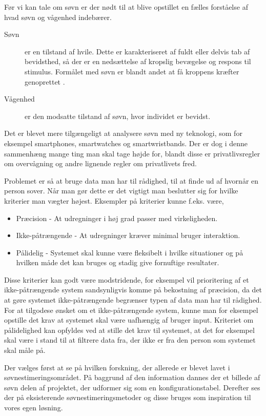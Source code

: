Før vi kan tale om søvn er der nødt til at blive opstillet en fælles forståelse af hvad søvn og vågenhed indebærer.
\begin{description}
		\item[Søvn] er en tilstand af hvile. Dette er karakteriseret af fuldt eller delvis tab af bevidsthed, så der er en nedsættelse af kropslig bevægelse og respons til stimulus. Formålet med søvn er blandt andet at få kroppens kræfter genoprettet \citep{misc:SleepDefinition}.
		\item[Vågenhed] er den modsatte tilstand af søvn, hvor individet er bevidst.
\end{description}

Det er blevet mere tilgængeligt at analysere søvn med ny teknologi, som for eksempel smartphones, smartwatches og smartwristbands.
Der er dog i denne sammenhæng mange ting man skal tage højde for, blandt disse er privatlivsregler om overvågning og andre lignende regler om privatlivets fred.

Problemet er så at bruge data man har til rådighed, til at finde ud af hvornår en person sover.
Når man gør dette er det vigtigt man beslutter sig for hvilke kriterier man vægter højest.
Eksempler på kriterier kunne f.eks. være,

\begin{itemize}
	\item Præcision - At udregninger i høj grad passer med virkeligheden.
	\item Ikke-påtrængende - At udregninger kræver minimal bruger interaktion.
	\item Pålidelig - Systemet skal kunne være fleksibelt i hvilke situationer og på hvilken måde det kan bruges og stadig give fornuftige resultater.
\end{itemize}

Disse kriterier kan godt være modstridende, for eksempel vil prioritering af et ikke-påtrængende system sandsynligvis komme på bekostning af præcision, da det at gøre systemet ikke-påtrængende begrænser typen af data man har til rådighed.
For at tilgodese ønsket om et ikke-påtrængende system, kunne man for eksempel opstille det krav at systemet skal være uafhængig af bruger input.
Kriteriet om pålidelighed kan opfyldes ved at stille det krav til systemet, at det for eksempel skal være i stand til at filtrere data fra, der ikke er fra den person som systemet skal måle på.

Der vælges først at se på hvilken forskning, der allerede er blevet lavet i søvn\-es\-ti\-me\-rings\-om\-rå\-det.
På baggrund af den information dannes der et billede af søvn delen af projektet, der udformer sig som en konfigurationstabel.
Derefter ses der på eksisterende søvnestimeringsmetoder og disse bruges som inspiration til vores egen løsning.